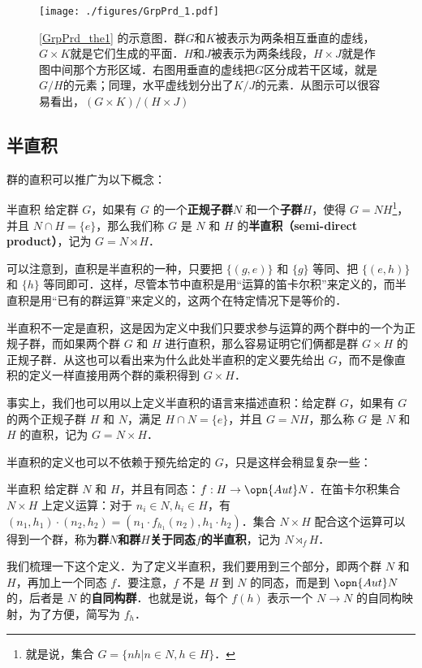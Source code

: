 \begin{figure}[ht]
\centering
\texttt{[image: ./figures/GrpPrd\_1.pdf]}
\caption{\autoref{GrpPrd_the1} 的示意图．群$G$和$K$被表示为两条相互垂直的虚线，$G\times K$就是它们生成的平面．$H$和$J$被表示为两条线段，$H\times J$就是作图中间那个方形区域．右图用垂直的虚线把$G$区分成若干区域，就是$G/H$的元素；同理，水平虚线划分出了$K/J$的元素．从图示可以很容易看出，$(G\times K)/(H\times J)$} \label{GrpPrd_fig1}
\end{figure}

\subsection{半直积}

群的直积可以推广为以下概念：

\begin{definition}{半直积}
给定群 $G$，如果有 $G$ 的一个\textbf{正规子群}$N$ 和一个\textbf{子群}$H$，使得 $G=NH$\footnote{就是说，集合 $G=\{nh|n\in N, h\in H\}$．}，并且 $N\cap H=\{e\}$，那么我们称 $G$ 是 $N$ 和 $H$ 的\textbf{半直积（semi-direct product）}，记为 $G=N\rtimes H$．
\end{definition}

可以注意到，直积是半直积的一种，只要把 $\{(g, e)\}$ 和 $\{g\}$ 等同、把 $\{(e, h)\}$ 和 $\{h\}$ 等同即可．这样，尽管本节中直积是用“运算的笛卡尔积”来定义的，而半直积是用“已有的群运算”来定义的，这两个在特定情况下是等价的．

半直积不一定是直积，这是因为定义中我们只要求参与运算的两个群中的一个为正规子群，而如果两个群 $G$ 和 $H$ 进行直积，那么容易证明它们俩都是群 $G\times H$ 的正规子群．从这也可以看出来为什么此处半直积的定义要先给出 $G$，而不是像直积的定义一样直接用两个群的乘积得到 $G\times H$．

事实上，我们也可以用以上定义半直积的语言来描述直积：给定群 $G$，如果有 $G$ 的两个正规子群 $H$ 和 $N$，满足 $H\cap N=\{e\}$，并且 $G=NH$，那么称 $G$ 是 $N$ 和 $H$ 的直积，记为 $G=N\times H$．

半直积的定义也可以不依赖于预先给定的 $G$，只是这样会稍显复杂一些：

\begin{definition}{半直积}
给定群 $N$ 和 $H$，并且有同态：$f:H\rightarrow \opn{Aut}N$．在笛卡尔积集合 $N\times H$ 上定义运算：对于 $n_i\in N, h_i\in H$，有 $(n_1, h_1)\cdot(n_2, h_2)=(n_1\cdot f_{h_1}(n_2), h_1\cdot h_2)$．集合 $N\times H$ 配合这个运算可以得到一个群，称为\textbf{群}$N$\textbf{和群}$H$\textbf{关于同态}$f$\textbf{的半直积}，记为 $N\rtimes_fH$．
\end{definition}

我们梳理一下这个定义．为了定义半直积，我们要用到三个部分，即两个群 $N$ 和 $H$，再加上一个同态 $f$．要注意，$f$ 不是 $H$ 到 $N$ 的同态，而是到 $\opn{Aut} N$ 的，后者是 $N$ 的\textbf{自同构群}．也就是说，每个 $f(h)$ 表示一个 $N\rightarrow N$ 的自同构映射，为了方便，简写为 $f_h$．















